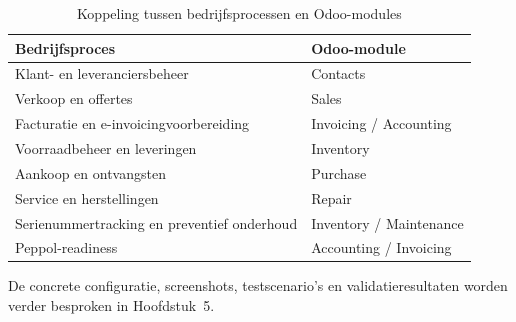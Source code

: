 \begin{table}[H]
\centering
\caption{Koppeling tussen bedrijfsprocessen en Odoo-modules}
\label{tab:odoo-modules}
\begin{tabular}{|p{5cm}|p{5cm}|}
\hline
\textbf{Bedrijfsproces} & \textbf{Odoo-module} \\
\hline
Klant- en leveranciersbeheer & Contacts \\
\hline
Verkoop en offertes & Sales \\
\hline
Facturatie en e-invoicingvoorbereiding & Invoicing / Accounting \\
\hline
Voorraadbeheer en leveringen & Inventory \\
\hline
Aankoop en ontvangsten & Purchase \\
\hline
Service en herstellingen & Repair \\
\hline
Serienummertracking en preventief onderhoud & Inventory / Maintenance \\
\hline
Peppol-readiness & Accounting / Invoicing \\
\hline
\end{tabular}
\end{table}

De concrete configuratie, screenshots, testscenario’s en validatieresultaten worden verder besproken in Hoofdstuk~5.
